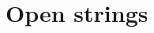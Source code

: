 \documentclass[a4paper,pdftex,10pt]{article}
\begin{document}
\maketitle

\tableofcontents

\clearpage
\section{Open strings}












\clearpage



\nocite{Polchinski:1998rq}
\nocite{Polchinski:1998rr}
\nocite{Ibanez:2012}
\nocite{Green:2012a}
\nocite{Green:2012b}

\end{document}
